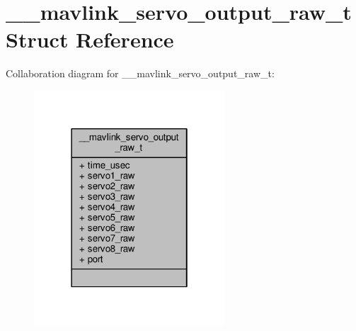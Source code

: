 \hypertarget{struct____mavlink__servo__output__raw__t}{\section{\+\_\+\+\_\+mavlink\+\_\+servo\+\_\+output\+\_\+raw\+\_\+t Struct Reference}
\label{struct____mavlink__servo__output__raw__t}
}


Collaboration diagram for \+\_\+\+\_\+mavlink\+\_\+servo\+\_\+output\+\_\+raw\+\_\+t\+:
\nopagebreak
\begin{figure}[H]
\begin{center}
\leavevmode
\includegraphics[width=202pt]{struct____mavlink__servo__output__raw__t__coll__graph}
\end{center}
\end{figure}
